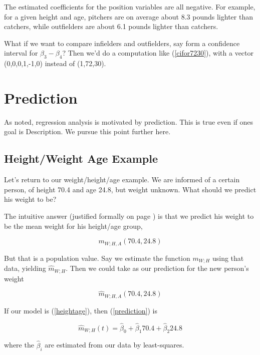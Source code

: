The estimated coefficients for the position variables are all negative.
For example, for a given height and age, pitchers are on average about
8.3 pounds lighter than catchers, while outfielders are about 6.1 pounds
lighter than catchers.

What if we want to compare infielders and outfielders, say form a
confidence interval for $\beta_3 - \beta_4$?  Then we'd do a computation
like (\ref{cifor7230}), with a vector (0,0,0,1,-1,0) instead of
(1,72,30).

\section{Prediction}
\label{howpredict}

As noted, regression analysis is motivated by prediction.  This is true
even if ones goal is Description.  We pursue this point further here.

\subsection{Height/Weight Age Example}

Let's return to our weight/height/age example.  We are informed of a
certain person, of height 70.4 and age 24.8, but weight unknown.  What
should we predict his weight to be?

The intuitive answer (justified formally on page \pageref{optimpred}) is
that we predict his weight to be the mean weight for his height/age
group, 

\begin{equation}
m_{W;H,A}(70.4,24.8)
\end{equation}

But that is a population value.  Say we estimate the function $m_{W;H}$
using that data, yielding $\widehat{m}_{W;H}$.  Then we could take as
our prediction for the new person's weight

\begin{equation}
\label{prediction}
\widehat{m}_{W;H,A}(70.4,24.8)
\end{equation}

If our model is (\ref{heightage}), then (\ref{prediction}) is

\begin{equation}
\label{predex}
\widehat{m}_{W;H}(t) = \widehat{\beta}_0 + \widehat{\beta}_1 70.4 + 
\widehat{\beta}_2 24.8
\end{equation}

where the $\widehat{\beta}_i$ are estimated from our data by
least-squares.

